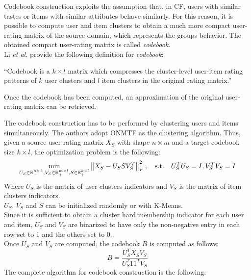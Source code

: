 Codebook construction exploits the assumption that, in CF, users with similar tastes or items with similar attributes behave similarly. For this reason, it is possible to compute user and item clusters to obtain a much more compact user-rating matrix of the source domain, which represents the groups behavior. The obtained compact user-rating matrix is called \textit{codebook}.\\
Li \textit{et al.} provide the following definition for \textit{codebook}:
\begin{displayquote}
\enquote{Codebook is a $k \times l$ matrix which compresses the cluster-level user-item rating patterns of $k$ user clusters and $l$ item clusters in the original rating matrix.}
\end{displayquote}
Once the codebook has been computed, an approximation of the original user-rating matrix can be retrieved.\par
The codebook construction has to be performed by clustering users and items simultaneously. The authors adopt ONMTF \cite{10.1145/1150402.1150420} as the clustering algorithm. Thus, given a source user-rating matrix $X_S$ with shape $n \times m$ and a target codebook size $k \times l$, the optimization problem is the following:
\begin{equation}
\min_{U_S \in \mathbb{R}^{n \times k}_+, V_S \in \mathbb{R}^{m \times l}_+, S \in \mathbb{R}^{k \times l}_+} \left\lVert X_S - U_S S V_S^T\right\rVert_F^2, \quad \text{s.t.} \quad U_S^T U_S = I, V_S^T V_S = I
\end{equation}
Where $U_S$ is the matrix of user clusters indicators and $V_S$ is the matrix of item clusters indicators.\\
$U_S$, $V_S$ and $S$ can be initialized randomly or with K-Means.\\
Since it is sufficient to obtain a cluster hard membership indicator for each user and item, $U_S$ and $V_S$ are binarized to have only the non-negative entry in each row set to 1 and the others set to 0.\\
Once $U_S$ and $V_S$ are computed, the codebook $B$ is computed as follows:
\begin{equation}
\label{eq:codebook-construction}
B = \frac{U_S^T X_S V_S}{U_S^T 11^T V_S}
\end{equation}
The complete algorithm for codebook construction is the following:
\vskip 0.7cm
